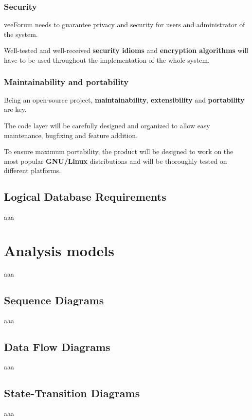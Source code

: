 \documentclass[12pt]{report}
\renewcommand\emph{\textbf}
\begin{document}
                    \subsubsection{Security}
                        veeForum needs to guarantee privacy and security for users and administrator of the system.

                        Well-tested and well-received \emph{security idioms} and \emph{encryption algorithms} will have to be used throughout the implementation of the whole system.

                    \subsubsection{Maintainability and portability}
                        Being an open-source project, \emph{maintainability}, \emph{extensibility} and \emph{portability} are key.

                        The code layer will be carefully designed and organized to allow easy maintenance, bugfixing and feature addition.

                        To ensure maximum portability, the product will be designed to work on the most popular \emph{GNU/Linux} distributions and will be thoroughly tested on different platforms.

                \subsection{Logical Database Requirements}
                    aaa

            \section{Analysis models}
                aaa
                
                \subsection{Sequence Diagrams}
                    aaa

                \subsection{Data Flow Diagrams}
                    aaa

                \subsection{State-Transition Diagrams}
                    aaa
\end{document}
